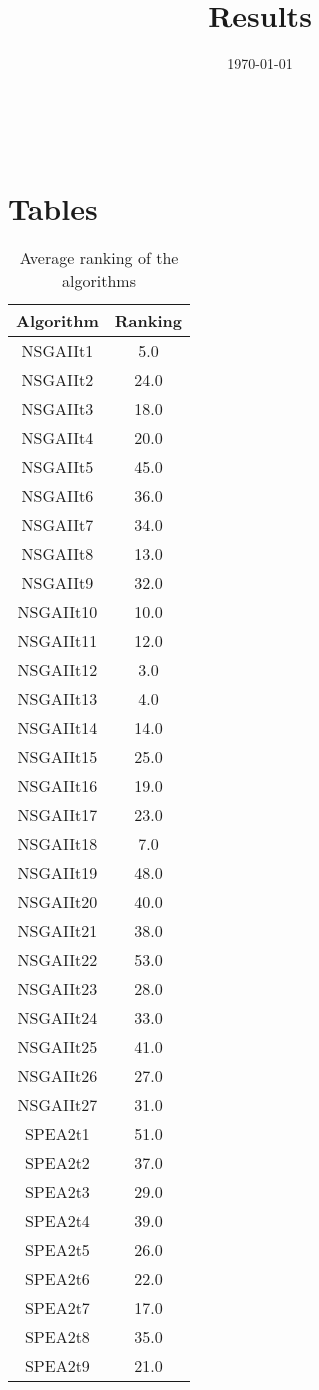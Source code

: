 \documentclass{article}
\title{Results}
\author{}
\date{\today}
\begin{document}
\oddsidemargin 0in \topmargin 0in\maketitle
\
\section{Tables}
\begin{table}[!htp]
\centering
\caption{Average ranking of the algorithms}
\begin{tabular}{c|c}
Algorithm&Ranking\\
\hline
NSGAIIt1&5.0\\
NSGAIIt2&24.0\\
NSGAIIt3&18.0\\
NSGAIIt4&20.0\\
NSGAIIt5&45.0\\
NSGAIIt6&36.0\\
NSGAIIt7&34.0\\
NSGAIIt8&13.0\\
NSGAIIt9&32.0\\
NSGAIIt10&10.0\\
NSGAIIt11&12.0\\
NSGAIIt12&3.0\\
NSGAIIt13&4.0\\
NSGAIIt14&14.0\\
NSGAIIt15&25.0\\
NSGAIIt16&19.0\\
NSGAIIt17&23.0\\
NSGAIIt18&7.0\\
NSGAIIt19&48.0\\
NSGAIIt20&40.0\\
NSGAIIt21&38.0\\
NSGAIIt22&53.0\\
NSGAIIt23&28.0\\
NSGAIIt24&33.0\\
NSGAIIt25&41.0\\
NSGAIIt26&27.0\\
NSGAIIt27&31.0\\
SPEA2t1&51.0\\
SPEA2t2&37.0\\
SPEA2t3&29.0\\
SPEA2t4&39.0\\
SPEA2t5&26.0\\
SPEA2t6&22.0\\
SPEA2t7&17.0\\
SPEA2t8&35.0\\
SPEA2t9&21.0\\

\end{tabular}
\end{table}
\end{document}
